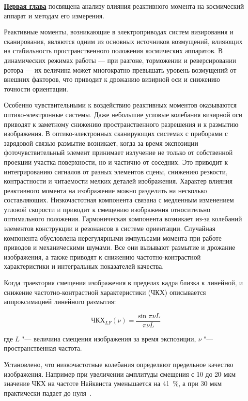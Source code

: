 \underline{\textbf{Первая глава}} посвящена анализу влияния реактивного момента на космический аппарат и методам его измерения.

Реактивные моменты, возникающие в электроприводах систем визирования и сканирования, являются одним из основных источников возмущений, влияющих на стабильность пространственного положения космических аппаратов. В динамических режимах работы — при разгоне, торможении и реверсировании ротора — их величина может многократно превышать уровень возмущений от внешних факторов, что приводит к дрожанию визирной оси и снижению точности ориентации.

Особенно чувствительными к воздействию реактивных моментов оказываются оптико-электронные системы. Даже небольшие угловые колебания визирной оси приводят к заметному снижению пространственного разрешения и к размытию изображения. В оптико-электронных сканирующих системах с приборами с зарядовой связью размытие возникает, когда за время экспозиции фоточувствительный элемент принимает излучение не только от собственной проекции участка поверхности, но и частично от соседних. Это приводит к интегрированию сигналов от разных элементов сцены, снижению резкости, контрастности и читаемости мелких деталей изображения. Характер влияния реактивного момента на изображение можно разделить на несколько составляющих. Низкочастотная компонента связана с медленным изменением угловой скорости и приводит к смещению изображения относительно оптимального положения. Гармоническая компонента возникает из-за колебаний элементов конструкции и резонансов в системе ориентации. Случайная компонента обусловлена нерегулярными импульсами момента при работе приводов и механическими шумами. Все они вызывают размытие и дрожание изображения, а также приводят к снижению частотно-контрастной характеристики и интегральных показателей качества.

Когда траектория смещения изображения в пределах кадра близка к линейной, и снижение частотно-контрастной характеристики (ЧКХ) описывается аппроксимацией
линейного размытия:

\begin{equation*}
	\label{mtf_lf}
	\text{ЧКХ}_{LF}(\nu)=\frac{\sin{\pi \nu L}}{\pi \nu L}
\end{equation*}

где \(L\) "--- величина смещения изображения за время экспозиции, \(\nu\) "--- пространственная частота.

Установлено, что низкочастотные колебания определяют предельное качество изображения. Например при увеличении амплитуды смещения с 10 до 20 мкм значение ЧКХ на частоте Найквиста уменьшается на 41~\%, а при 30 мкм практически падает до нуля~\cite{wahballah2018smear}.


